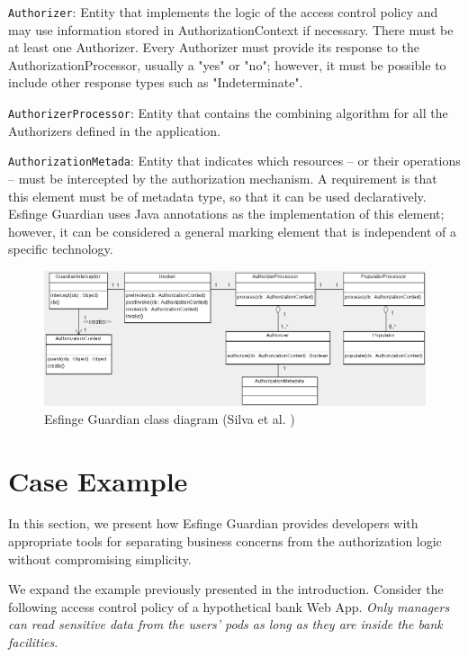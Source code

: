 \documentclass[sigconf]{acmart}
\begin{document}
\noindent \verb|Authorizer|: Entity that implements the logic of the access control policy and may use information stored in AuthorizationContext if necessary. There must be at least one Authorizer. Every Authorizer must provide its response to the AuthorizationProcessor, usually a "yes" or "no"; however, it must be possible to include other response types such as "Indeterminate".


\noindent \verb|AuthorizerProcessor|: Entity that contains the combining algorithm for all the Authorizers defined in the application.


\noindent \verb|AuthorizationMetada|: Entity that indicates which resources – or their operations – must be intercepted by the authorization mechanism. A requirement is that this element must be of metadata type, so that it can be used declaratively. Esfinge Guardian uses Java annotations as the implementation of this element; however, it can be considered a general marking element that is independent of a specific technology.



\begin{figure}
  \centering
  \includegraphics[scale=0.45]{img/guardian-class-diagram.png}
  \caption{Esfinge Guardian class diagram (Silva et al. \cite{Silva2013})}
  \label{fig:guardian-class-diagram}
\end{figure}


\section{Case Example}

In this section, we present how Esfinge Guardian provides developers with appropriate tools for separating business concerns from the authorization logic without compromising simplicity.

We expand the example previously presented in the introduction. Consider the following access control policy of a hypothetical bank Web App. \textit{Only managers can read sensitive data from the users' pods as long as they are inside the bank facilities}.
\end{document}
